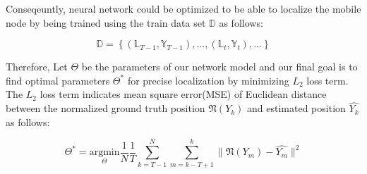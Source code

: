 \documentclass[letterpaper, 10 pt, conference]{ieeeconf}  %
\begin{document}
Conseqeuntly, neural network could be optimized to be able to localize the mobile node by being trained using the train data set $\mathbb{D}$ as follows:  

\begin{equation}
\mathbb{D} = \left\{(\mathbb{L}_{T-1}, \mathbb{Y}_{T-1}),...,(\mathbb{L}_t, \mathbb{Y}_t),...\right\} 
\end{equation}

Therefore, Let $\Theta$ be the parameters of our network model and our final goal is to find optimal parameters $\Theta^{*}$ for precise localization by minimizing $L_2$ loss term. The $L_2$ loss term indicates mean square error(MSE) of Euclidean distance between the normalized ground truth position $\mathfrak{N}(Y_k)$ and estimated position $\hat{Y_k}$ as follows:

\begin{equation}
\Theta^{*} = \underset{\Theta}{\mathrm{argmin}} \frac{1}{N}\frac{1}{T} \sum_{k=T-1}^N\sum_{m=k-T+1}^k \parallel \mathfrak{N}(Y_m) - \hat{Y_m} \parallel^{2}
\end{equation}  
\end{document}
